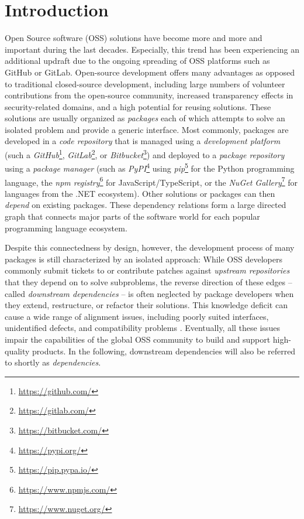 \section{Introduction}
\label{sec:introduction}

Open Source software (OSS) solutions have become more and more and important during the last decades.
Especially, this trend has been experiencing an additional updraft due to the ongoing spreading of OSS platforms such as GitHub or GitLab.
Open-source development offers many advantages as opposed to traditional closed-source development, including large numbers of volunteer contributions from the open-source community, increased transparency effects in security-related domains, and a high potential for reusing solutions.
These solutions are usually organized as \emph{packages} each of which attempts to solve an isolated problem and provide a generic interface.
Most commonly, packages are developed in a \emph{code repository} that is managed using a \emph{development platform} (such a \emph{GitHub}\footnote{\url{https://github.com/}}, \emph{GitLab}\footnote{\url{https://gitlab.com/}}, or \emph{Bitbucket}\footnote{\url{https://bitbucket.com/}}) and deployed to a \emph{package repository} using a \emph{package manager} (such as \emph{PyPI}\footnote{\url{https://pypi.org/}} using \emph{pip}\footnote{\url{https://pip.pypa.io/}} for the Python programming language, the \emph{npm registry}\footnote{\url{https://www.npmjs.com/}} for JavaScript/TypeScript, or the \emph{NuGet Gallery}\footnote{\url{https://www.nuget.org/}} for languages from the .NET ecosystem).
Other solutions or packages can then \emph{depend} on existing packages.
These dependency relations form a large directed graph that connects major parts of the software world for each popular programming language ecosystem.

Despite this connectedness by design, however, the development process of many packages is still characterized by an isolated approach:
While OSS developers commonly submit tickets to or contribute patches against \emph{upstream repositories} that they depend on to solve subproblems, the reverse direction of these edges -- called \emph{downstream dependencies} -- is often neglected by package developers when they extend, restructure, or refactor their solutions.
This knowledge deficit can cause a wide range of alignment issues, including poorly suited interfaces, unidentified defects, and compatibility problems \citep[see][]{bogart2015breaks}. 
Eventually, all these issues impair the capabilities of the global OSS community to build and support high-quality products.
In the following, downstream dependencies will also be referred to shortly as \emph{dependencies}.

